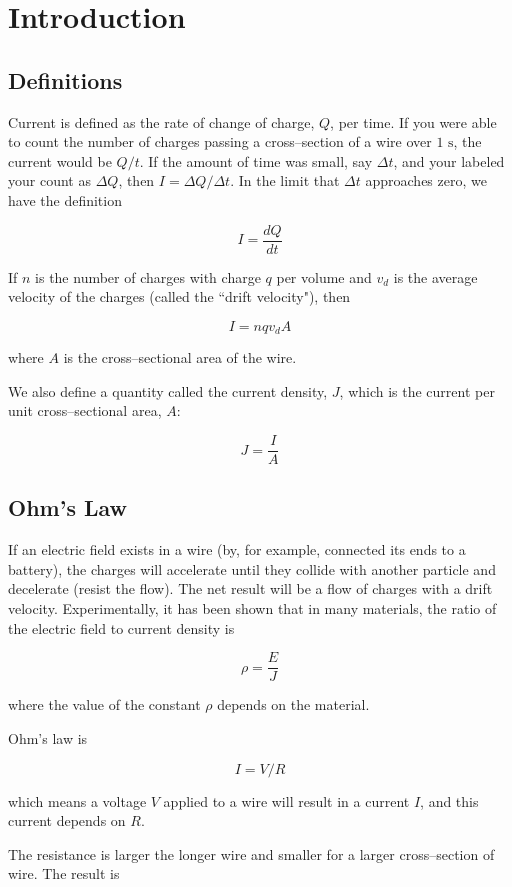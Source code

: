 \documentclass{article}
\begin{document}
\section{Introduction}

\subsection{Definitions}

Current is defined as the rate of change of charge, $Q$, per time. If you were able to count the number of charges passing a cross--section of a wire over $1\text{ s}$, the current would be $Q/t$. If the amount of time was small, say $\Delta t$, and your labeled your count as $\Delta Q$, then $I = {\Delta Q}/{\Delta t}$. In the limit that $\Delta t$ approaches zero, we have the definition 

$$I = \frac{dQ}{dt}$$

If $n$ is the number of charges with charge $q$ per volume and $v_d$ is the average velocity of the charges (called the ``drift velocity"), then

$$I = nqv_dA$$

where $A$ is the cross--sectional area of the wire.

We also define a quantity called the current density, $J$, which is the current per unit cross--sectional area, $A$:

$$J = \frac{I}{A}$$

\subsection{Ohm's Law}

If an electric field exists in a wire (by, for example, connected its ends to a battery), the charges will accelerate until they collide with another particle and decelerate (resist the flow). The net result will be a flow of charges with a drift velocity. Experimentally, it has been shown that in many materials, the ratio of the electric field to current density is 

$$\rho = \frac{E}{J}$$

where the value of the constant $\rho$ depends on the material.

Ohm's law is

$$I = V/R$$

which means a voltage $V$ applied to a wire will result in a current $I$, and this current depends on $R$.

The resistance is larger the longer wire and smaller for a larger cross--section of wire. The result is
\end{document}

